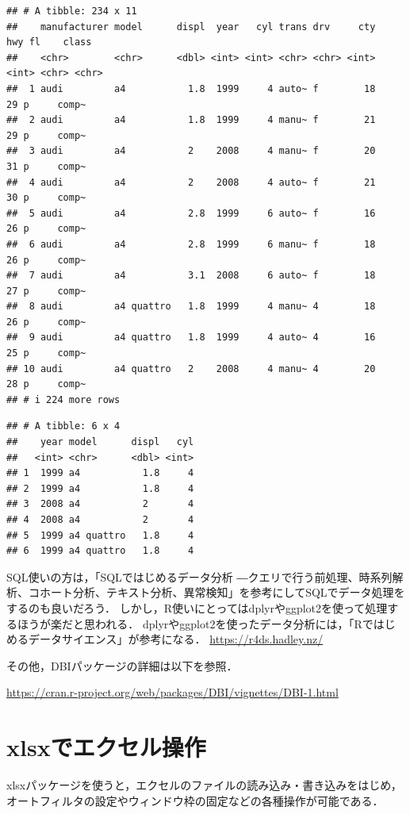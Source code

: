 \documentclass[
]{article}
\begin{document}
\begin{verbatim}
## # A tibble: 234 x 11
##    manufacturer model      displ  year   cyl trans drv     cty   hwy fl    class
##    <chr>        <chr>      <dbl> <int> <int> <chr> <chr> <int> <int> <chr> <chr>
##  1 audi         a4           1.8  1999     4 auto~ f        18    29 p     comp~
##  2 audi         a4           1.8  1999     4 manu~ f        21    29 p     comp~
##  3 audi         a4           2    2008     4 manu~ f        20    31 p     comp~
##  4 audi         a4           2    2008     4 auto~ f        21    30 p     comp~
##  5 audi         a4           2.8  1999     6 auto~ f        16    26 p     comp~
##  6 audi         a4           2.8  1999     6 manu~ f        18    26 p     comp~
##  7 audi         a4           3.1  2008     6 auto~ f        18    27 p     comp~
##  8 audi         a4 quattro   1.8  1999     4 manu~ 4        18    26 p     comp~
##  9 audi         a4 quattro   1.8  1999     4 auto~ 4        16    25 p     comp~
## 10 audi         a4 quattro   2    2008     4 manu~ 4        20    28 p     comp~
## # i 224 more rows
\end{verbatim}

\begin{verbatim}
## # A tibble: 6 x 4
##    year model      displ   cyl
##   <int> <chr>      <dbl> <int>
## 1  1999 a4           1.8     4
## 2  1999 a4           1.8     4
## 3  2008 a4           2       4
## 4  2008 a4           2       4
## 5  1999 a4 quattro   1.8     4
## 6  1999 a4 quattro   1.8     4
\end{verbatim}

SQL使いの方は，「SQLではじめるデータ分析 ―クエリで行う前処理、時系列解析、コホート分析、テキスト分析、異常検知」を参考にしてSQLでデータ処理をするのも良いだろう．
しかし，R使いにとってはdplyrやggplot2を使って処理するほうが楽だと思われる．
dplyrやggplot2を使ったデータ分析には，「Rではじめるデータサイエンス」が参考になる．
\url{https://r4ds.hadley.nz/}

その他，DBIパッケージの詳細は以下を参照．

\url{https://cran.r-project.org/web/packages/DBI/vignettes/DBI-1.html}

\hypertarget{xlsx}{%
\section{xlsxでエクセル操作}\label{xlsx}}

xlsxパッケージを使うと，エクセルのファイルの読み込み・書き込みをはじめ，
オートフィルタの設定やウィンドウ枠の固定などの各種操作が可能である．
\end{document}
